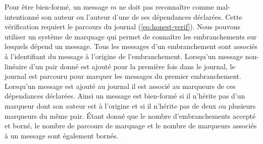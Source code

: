 %
%

Pour être bien-formé, un message $m$ ne doit pas reconnaître comme mal-intentionné son auteur ou l'auteur d'une de ses dépendances déclarées.
Cette vérification requiert le parcours du journal (\autoref{eq:honest-verif}).
Nous pouvons utiliser un système de marquage qui permet de connaître les embranchements sur lesquels dépend un message.
Tous les messages d'un embranchement sont associés à l'identifiant du message à l'origine de l'embranchement.
Lorsqu'un message non-linéaire d'un pair donné est ajouté pour la première fois dans le journal, le journal est parcouru pour marquer les messages du premier embranchement.
Lorsqu'un message est ajouté au journal il est associé au marqueurs de ces dépendances déclarées.
Ainsi un message est bien-formé si il n'hérite pas d'un marqueur dont son auteur est à l'origine et si il n'hérite pas de deux ou plusieurs marqueurs du même pair.
Étant donné que le nombre d'embranchements accepté et borné, le nombre de parcours de marquage et le nombre de marqueurs associés à un message sont également bornés.



